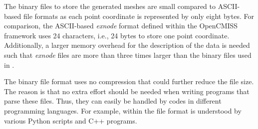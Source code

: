 The binary files to store the generated meshes are small compared to ASCII-based file formats as each point coordinate is represented by only eight bytes. For comparison, the ASCII-based \emph{exnode} format defined within the OpenCMISS framework uses 24 characters, i.e., 24 bytes to store one point coordinate. Additionally, a larger memory overhead for the description of the data is needed such that \emph{exnode} files are more than three times larger than the binary files used in \opendihu{}.

The binary file format uses no compression that could further reduce the file size. The reason is that no extra effort should be needed when writing programs that parse these files. Thus, they can easily be handled by codes in different programming languages. For example, within \opendihu{} the file format is understood by various Python scripts and C++ programs.

